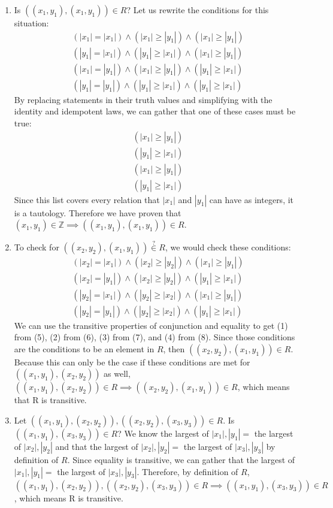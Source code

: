 \documentclass{article}
\begin{document}
\begin{enumerate}
    \item Is $((x_1,y_1),(x_1,y_1)) \in R$? Let us rewrite the conditions for this situation:
    \begin{gather*}
        (|x_1| = |x_1|) \land (|x_1| \geq |y_1|) \land (|x_1| \geq |y_1|) \\
        (|y_1| = |x_1|) \land (|y_1| \geq |x_1|) \land (|x_1| \geq |y_1|) \\
        (|x_1| = |y_1|) \land (|x_1| \geq |y_1|) \land (|y_1| \geq |x_1|) \\
        (|y_1| = |y_1|) \land (|y_1| \geq |x_1|) \land (|y_1| \geq |x_1|)
    \end{gather*}
    By replacing statements in their truth values and simplifying with the identity and idempotent laws, we can gather that one of these cases must be true:
    \begin{gather*}
        (|x_1| \geq |y_1|) \\
        (|y_1| \geq |x_1|) \\
        (|x_1| \geq |y_1|) \\
        (|y_1| \geq |x_1|)
    \end{gather*}
    Since this list covers every relation that $|x_1|$ and $|y_1|$ can have as integers, it is a tautology. Therefore we have proven that $(x_1,y_1) \in \mathbb{Z} \implies ((x_1,y_1),(x_1,y_1)) \in R$.


    \item To check for $((x_2,y_2),(x_1,y_1)) \stackrel{?}{\in} R$, we would check these conditions:
    \begin{gather}
        (|x_2| = |x_1|) \land (|x_2| \geq |y_2|) \land (|x_1| \geq |y_1|) \\
        (|x_2| = |y_1|) \land (|x_2| \geq |y_2|) \land (|y_1| \geq |x_1|) \\
        (|y_2| = |x_1|) \land (|y_2| \geq |x_2|) \land (|x_1| \geq |y_1|) \\
        (|y_2| = |y_1|) \land (|y_2| \geq |x_2|) \land (|y_1| \geq |x_1|)
    \end{gather}
    We can use the transitive properties of conjunction and equality to get (1) from (5), (2) from (6), (3) from (7), and (4) from (8). Since those conditions are the conditions to be an element in $R$, then $((x_2,y_2),(x_1,y_1)) \in R$. Because this can only be the case if these conditions are met for $((x_1,y_1), (x_2,y_2))$ as well, $((x_1,y_1), (x_2,y_2)) \in R \implies ((x_2,y_2),(x_1,y_1)) \in R$, which means that R is transitive.


    \item Let $((x_1,y_1), (x_2,y_2)), ((x_2,y_2),(x_3,y_3)) \in R$. Is $((x_1,y_1), (x_3,y_3)) \in R$? 
    We know the largest of $|x_1|,|y_1| =$ the largest of $|x_2|,|y_2|$ and that the largest of $|x_2|,|y_2| =$ the largest of $|x_3|,|y_3|$ by definition of $R$.
    Since equality is transitive, we can gather that the largest of $|x_1|,|y_1| =$ the largest of $|x_3|,|y_3|$. 
    Therefore, by definition of $R$, $((x_1,y_1), (x_2,y_2)), ((x_2,y_2),(x_3,y_3)) \in R \implies \allowbreak ((x_1,y_1), (x_3,y_3)) \in R$, which means R is transitive.
\end{enumerate}
\end{document}
